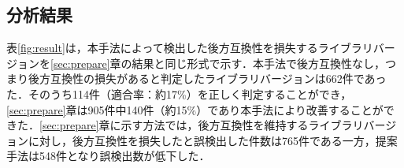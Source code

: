 \documentclass[submit]{ipsj}
\begin{document}
{\vspace{-2mm}
\subsection{分析結果}


\begin{table}[t]
\centering
\caption{テストコード変更内容に基づく後方互換性損失の検出結果}
\label{fig:result}
\vspace{-4mm}
\end{table}

表\ref{fig:result}は，本手法によって検出した後方互換性を損失するライブラリバージョンを\ref{sec:prepare}章の結果と同じ形式で示す．本手法で後方互換性なし，つまり後方互換性の損失があると判定したライブラリバージョンは662件であった．そのうち114件（適合率：約17\%）を正しく判定することができ，\ref{sec:prepare}章は905件中140件（約15\%）であり本手法により改善することができた．\ref{sec:prepare}章に示す方法では，後方互換性を維持するライブラリバージョンに対し，後方互換性を損失したと誤検出した件数は765件である一方，提案手法は548件となり誤検出数が低下した．

}
\end{document}
